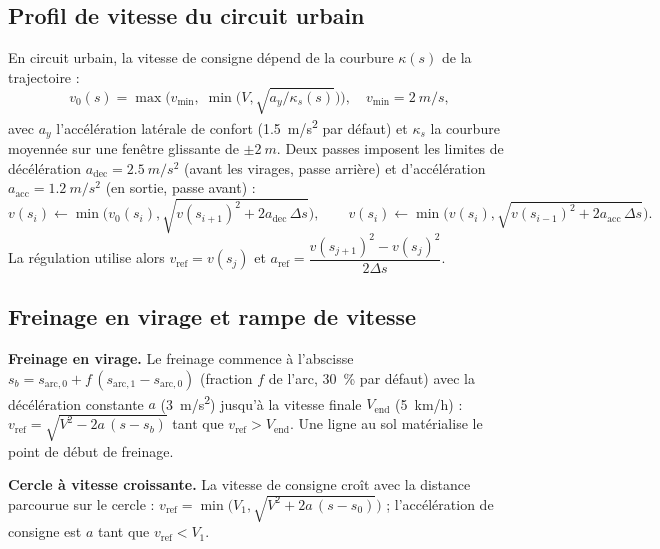 \documentclass[11pt,a4paper]{article}
\begin{document}
\subsection{Profil de vitesse du circuit urbain}
En circuit urbain, la vitesse de consigne dépend de la courbure $\kappa(s)$ de la trajectoire :
\begin{equation}
 v_0(s)=\max\!\Big(v_{\min},\;\min\big(V,\sqrt{a_y/\kappa_s(s)}\big)\Big),\quad v_{\min}=\SI{2}{m/s},
\end{equation}
avec $a_y$ l'accélération latérale de confort (\SI{1,5}{m/s^2} par défaut) et $\kappa_s$ la courbure moyennée sur une fenêtre glissante de $\pm\SI{2}{m}$. Deux passes imposent les limites de décélération $a_{\text{dec}}=\SI{2,5}{m/s^2}$ (avant les virages, passe arrière) et d'accélération $a_{\text{acc}}=\SI{1,2}{m/s^2}$ (en sortie, passe avant) :
\begin{equation}
 v(s_i)\leftarrow\min\big(v_0(s_i),\sqrt{v(s_{i+1})^2+2a_{\text{dec}}\,\Delta s}\big),\qquad
 v(s_i)\leftarrow\min\big(v(s_i),\sqrt{v(s_{i-1})^2+2a_{\text{acc}}\,\Delta s}\big).
\end{equation}
La régulation utilise alors $v_{\text{ref}}=v(s_j)$ et $a_{\text{ref}}=\dfrac{v(s_{j+1})^2-v(s_j)^2}{2\Delta s}$.

\subsection{Freinage en virage et rampe de vitesse}
\textbf{Freinage en virage.} Le freinage commence à l'abscisse $s_b=s_{\text{arc},0}+f\,(s_{\text{arc},1}-s_{\text{arc},0})$ (fraction $f$ de l'arc, \SI{30}{\%} par défaut) avec la décélération constante $a$ (\SI{3}{m/s^2}) jusqu'à la vitesse finale $V_{\text{end}}$ (\SI{5}{km/h}) : $v_{\text{ref}}=\sqrt{V^2-2a\,(s-s_b)}$ tant que $v_{\text{ref}}>V_{\text{end}}$. Une ligne au sol matérialise le point de début de freinage.\par
\textbf{Cercle à vitesse croissante.} La vitesse de consigne croît avec la distance parcourue sur le cercle : $v_{\text{ref}}=\min\big(V_1,\sqrt{V^2+2a\,(s-s_0)}\big)$ ; l'accélération de consigne est $a$ tant que $v_{\text{ref}}<V_1$.
\end{document}
